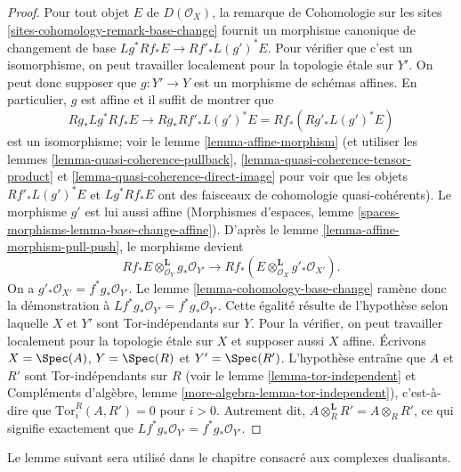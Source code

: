\begin{proof}
Pour tout objet $E$ de $D(\mathcal{O}_X)$, la remarque de Cohomologie sur les
sites \ref{sites-cohomology-remark-base-change} fournit un morphisme canonique
de changement de base $Lg^*Rf_*E\to Rf'_*L(g')^*E$. Pour v\'erifier que c'est
un isomorphisme, on peut travailler localement pour la topologie \'etale sur
$Y'$. On peut donc supposer que $g:Y'\to Y$ est un morphisme de sch\'emas
affines. En particulier, $g$ est affine et il suffit de montrer que
$$
Rg_*Lg^*Rf_*E \to Rg_*Rf'_*L(g')^*E = Rf_*(Rg'_* L(g')^* E)
$$
est un isomorphisme; voir le lemme \ref{lemma-affine-morphism} (et utiliser les
lemmes \ref{lemma-quasi-coherence-pullback},
\ref{lemma-quasi-coherence-tensor-product} et
\ref{lemma-quasi-coherence-direct-image} pour voir que les objets
$Rf'_*L(g')^*E$ et $Lg^*Rf_*E$ ont des faisceaux de cohomologie
quasi-coh\'erents). Le morphisme $g'$ est lui aussi affine (Morphismes
d'espaces, lemme \ref{spaces-morphisms-lemma-base-change-affine}). D'apr\`es le
lemme \ref{lemma-affine-morphism-pull-push}, le morphisme devient
$$
Rf_*E \otimes_{\mathcal{O}_Y}^\mathbf{L} g_*\mathcal{O}_{Y'}
\longrightarrow
Rf_*(E \otimes_{\mathcal{O}_X}^\mathbf{L} g'_*\mathcal{O}_{X'}).
$$
On a $g'_*\mathcal{O}_{X'}=f^*g_*\mathcal{O}_{Y'}$. Le lemme
\ref{lemma-cohomology-base-change} ram\`ene donc la d\'emonstration \`a
$Lf^*g_*\mathcal{O}_{Y'}=f^*g_*\mathcal{O}_{Y'}$. Cette \'egalit\'e r\'esulte de
l'hypoth\`ese selon laquelle $X$ et $Y'$ sont Tor-ind\'ependants sur $Y$. Pour
la v\'erifier, on peut travailler localement pour la topologie \'etale sur $X$
et supposer aussi $X$ affine. \'Ecrivons $X=\Spec(A)$, $Y=\Spec(R)$ et
$Y'=\Spec(R')$. L'hypoth\`ese entra\^ine que $A$ et $R'$ sont
Tor-ind\'ependants sur $R$ (voir le lemme \ref{lemma-tor-independent} et
Compl\'ements d'alg\`ebre, lemme \ref{more-algebra-lemma-tor-independent}),
c'est-\`a-dire que $\text{Tor}_i^R(A,R')=0$ pour $i>0$. Autrement dit,
$A\otimes_R^\mathbf{L}R'=A\otimes_RR'$, ce qui signifie exactement que
$Lf^*g_*\mathcal{O}_{Y'}=f^*g_*\mathcal{O}_{Y'}$.
\end{proof}

\noindent
Le lemme suivant sera utilis\'e dans le chapitre consacr\'e aux complexes
dualisants.

